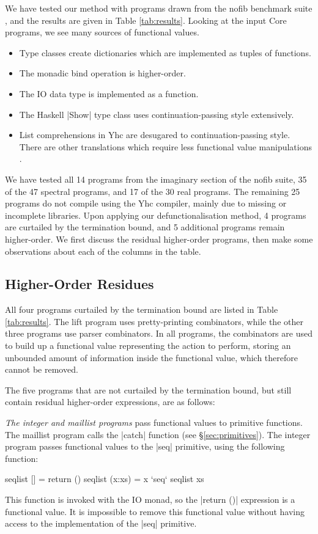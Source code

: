 \documentclass[preprint]{sigplanconf}
\begin{document}
We have tested our method with programs drawn from the nofib benchmark suite \cite{nofib}, and the results are given in Table \ref{tab:results}. Looking at the input Core programs, we see many sources of functional values.

\begin{itemize}
\item Type classes create dictionaries which are implemented as tuples of functions.
\item The monadic bind operation is higher-order.
\item The IO data type is implemented as a function.
\item The Haskell |Show| type class uses continuation-passing style extensively.
\item List comprehensions in Yhc are desugared to continuation-passing style. There are other translations which require less functional value manipulations \cite{coutts:stream_fusion}.
\end{itemize}

We have tested all 14 programs from the imaginary section of the nofib suite, 35 of the 47 spectral programs, and 17 of the 30 real programs. The remaining 25 programs do not compile using the Yhc compiler, mainly due to missing or incomplete libraries. Upon applying our defunctionalisation method, 4 programs are curtailed by the termination bound, and 5 additional programs remain higher-order. We first discuss the residual higher-order programs, then make some observations about each of the columns in the table.

\subsection{Higher-Order Residues}

All four programs curtailed by the termination bound are listed in Table \ref{tab:results}. The lift program uses pretty-printing combinators, while the other three programs use parser combinators. In all programs, the combinators are used to build up a functional value representing the action to perform, storing an unbounded amount of information inside the functional value, which therefore cannot be removed.

The five programs that are not curtailed by the termination bound, but still contain residual higher-order expressions, are as follows:

\begin{example}
\textit{The integer and maillist programs} pass functional values to primitive functions. The maillist program calls the |catch| function (see \S\ref{sec:primitives}). The integer program passes functional values to the |seq| primitive, using the following function:

\begin{code}
seqlist []      = return ()
seqlist (x:xs)  = x `seq` seqlist xs
\end{code}

This function is invoked with the IO monad, so the |return ()| expression is a functional value. It is impossible to remove this functional value without having access to the implementation of the |seq| primitive.
\end{example}
\end{document}
